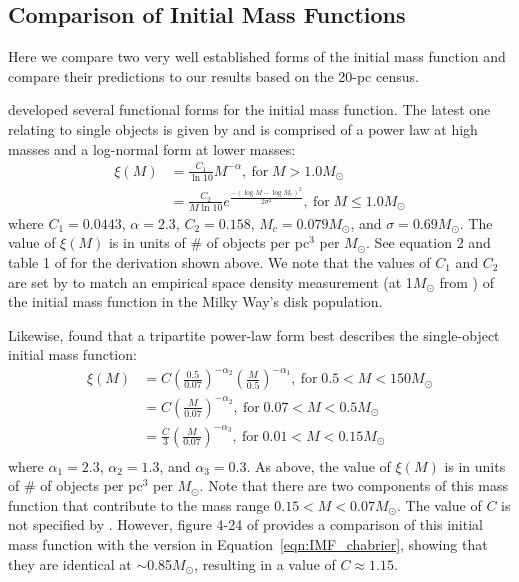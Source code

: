 \documentclass[twocolumn,tighten,twocolappendix]{aastex631}
\begin{document}
\subsection{Comparison of Initial Mass Functions}

Here we compare two very well established forms of the initial mass function and compare their predictions to our results based on the 20-pc census.

\cite{chabrier2001,chabrier2003a, chabrier2003b} developed several functional forms for the initial mass function. The latest one relating to single objects is given by \cite{chabrier2003b} and is comprised of a power law at high masses and a log-normal form at lower masses:
\begin{equation}
\label{eqn:IMF_chabrier}
\begin{split}
  \xi(M) & = \frac{C_1}{\ln{10}}M^{-\alpha}, \: \textrm{for}\;  M > 1.0 M_\odot \\
  & = \frac{C_2}{M \ln{10}} e^{\frac{-(\log{M} - \log{M_c})^2}{2\sigma^2}}, \: \textrm{for}\; M \le 1.0 M_\odot
\end{split}
\end{equation}
where $C_1 = 0.0443$,
$\alpha = 2.3$, $C_2 = 0.158$, $M_c = 0.079 M_\odot$, and $\sigma = 0.69 M_\odot$. The value of $\xi(M)$ is in units of \# of objects per pc$^3$ per $M_\odot$. See equation 2 and table 1 of \cite{chabrier2003b} for the derivation shown above. We note that the values of $C_1$ and $C_2$ are set by \cite{chabrier2003b} to match an empirical space density measurement (at 1$M_\odot$ from \citealt{scalo1986}) of the initial mass function in the Milky Way's disk population.

Likewise, \cite{kroupa2013} found that a tripartite power-law form best describes the single-object initial mass function:
\begin{equation}
\label{eqn:IMF_kroupa}
\begin{split}
   \xi(M) & = C \left( {\frac{0.5}{0.07}} \right) ^{-\alpha_2} \left( {\frac{M}{0.5}} \right) ^{-\alpha_1}, \: \textrm{for}\; 0.5 < M < 150 M_\odot \\
   & = C \left( \frac{M}{0.07} \right) ^{-\alpha_2}, \: \textrm{for}\; 0.07 < M < 0.5 M_\odot \\
   & = \frac{C}{3} \left( \frac{M}{0.07} \right)^{-\alpha_3}, \: \textrm{for}\; 0.01 < M < 0.15 M_\odot \\
\end{split}
\end{equation}
where $\alpha_1 = 2.3$, $\alpha_2 = 1.3$, and $\alpha_3 = 0.3$. As above, the value of $\xi(M)$ is in units of \# of objects per pc$^3$ per $M_\odot$. Note that there are two components of this mass function that contribute to the mass range $0.15 < M < 0.07 M_\odot$. The value of $C$ is not specified by \cite{kroupa2013}. However, figure 4-24 of \cite{kroupa2013} provides a comparison of this initial mass function with the \cite{chabrier2003b} version in Equation~\ref{eqn:IMF_chabrier}, showing that they are identical at $\sim$0.85$M_\odot$, resulting in a value of $C \approx 1.15$.
\end{document}
